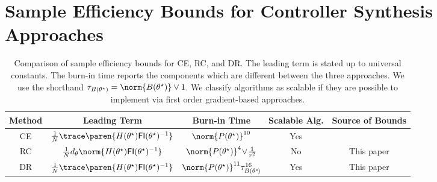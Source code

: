 \section{Sample Efficiency Bounds for Controller Synthesis Approaches}

\vspace{-5pt}

\begin{table}[h!]
    \centering
    \begin{tabular}{|c|c|c|c|c|}
    \hline
        Method\! & Leading Term & Burn-in Time & \!Scalable Alg.\! & Source of Bounds \\
    \hline
     CE & $\frac{1}{N}\trace\paren{H(\theta^\star) \mathsf{FI}(\theta^\star)^{-1}}$ & $ {\norm{P(\theta^\star)}^{10}}$ & Yes & \!\citet{wagenmaker2021task}\footnotemark\! \\
     \hline
     RC & $\frac{1}{N} d_{\theta} \norm{H(\theta^\star) \mathsf{FI}(\theta^\star)^{-1}}$ & ${\!\norm{P(\theta^\star)}^4\!\vee\! \frac{1}{r^2}}\!$ & No & This paper \\
     \hline
     DR & $\frac{1}{N}\trace\paren{H(\theta^\star) \mathsf{FI}(\theta^\star)^{-1}}$ & $ \!{\norm{P(\theta^\star)}^{11}} \tau_{B(\theta^\star\!)}^{16}\!$ & Yes & This paper \\
     \hline
    \end{tabular}
    \vspace{-6pt}
    \caption{Comparison of sample efficiency bounds for CE, RC, and DR. The leading term is stated up to universal constants. The burn-in time reports the components which are different between the three approaches. We use the shorthand $\tau_{B(\theta^\star)} = \norm{B(\theta^\star)} \vee 1$. We classify algorithms as scalable if they are possible to implement via first order gradient-based approaches.}
    \vspace{-2pt}
    \label{tab:sample_efficiency}
\end{table}


